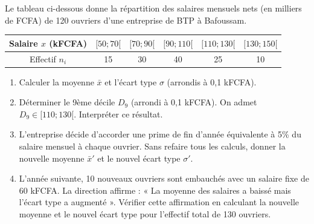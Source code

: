 \documentclass[11pt]{article}
\begin{document}
\begin{exercice}
\label{exo:btp}
Le tableau ci-dessous donne la répartition des salaires mensuels nets (en milliers de FCFA) de 120 ouvriers d'une entreprise de BTP à Bafoussam.

\begin{center}
\begin{tabular}{|c|c|c|c|c|c|}
\hline
Salaire $x$ (kFCFA) & $[50; 70[$ & $[70; 90[$ & $[90; 110[$ & $[110; 130[$ & $[130; 150[$ \\ \hline
Effectif $n_i$ & 15 & 30 & 40 & 25 & 10 \\ \hline
\end{tabular}
\end{center}

\begin{enumerate}
    \item Calculer la moyenne $\bar{x}$ et l'écart type $\sigma$ (arrondis à 0,1 kFCFA).
    \item Déterminer le 9ème décile $D_9$ (arrondi à 0,1 kFCFA). On admet $D_9 \in [110; 130[$. Interpréter ce résultat.
    \item L'entreprise décide d'accorder une prime de fin d'année équivalente à 5\% du salaire mensuel à chaque ouvrier. Sans refaire tous les calculs, donner la nouvelle moyenne $\bar{x}'$ et le nouvel écart type $\sigma'$.
    \item L'année suivante, 10 nouveaux ouvriers sont embauchés avec un salaire fixe de 60 kFCFA. La direction affirme : « La moyenne des salaires a baissé mais l'écart type a augmenté ». Vérifier cette affirmation en calculant la nouvelle moyenne et le nouvel écart type pour l'effectif total de 130 ouvriers.
\end{enumerate}
\end{exercice}
\end{document}
